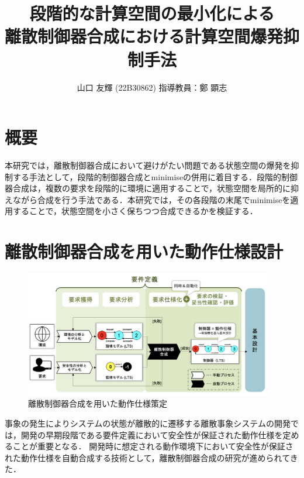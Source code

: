 \documentclass[11pt]{jarticle}
\begin{document}

\title{段階的な計算空間の最小化による\\離散制御器合成における計算空間爆発抑制手法}
\author{山口 友輝 (22B30862) \;\; 指導教員：鄭 顕志}
\date{\empty} %
\maketitle %
\thispagestyle{fancy}


\section{概要} 
本研究では，離散制御器合成において避けがたい問題である状態空間の爆発を抑制する手法として，段階的制御器合成とminimiseの併用に着目する．段階的制御器合成は，複数の要求を段階的に環境に適用することで，状態空間を局所的に抑えながら合成を行う手法である．本研究では，その各段階の末尾でminimiseを適用することで，状態空間を小さく保ちつつ合成できるかを検証する．


\section{離散制御器合成を用いた動作仕様設計}

\begin{figure}
  \centering
  \includegraphics[width=10.8cm]{./figures/DCS.png}
  \caption{離散制御器合成を用いた動作仕様策定}
  \label{fig:1}
\end{figure}

事象の発生によりシステムの状態が離散的に遷移する離散事象システムの開発では，開発の早期段階である要件定義において安全性が保証された動作仕様を定めることが重要となる\cite{rebok}．
開発時に想定される動作環境下において安全性が保証された動作仕様を自動合成する技術として，離散制御器合成\cite{concurrency}の研究が進められてきた．
\end{document}
